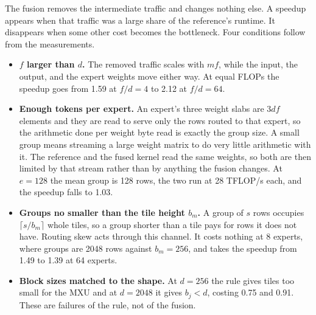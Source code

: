 \documentclass[10pt]{article}
\begin{document}
The fusion removes the intermediate traffic and changes nothing else. A
speedup appears when that traffic was a large share of the reference's
runtime. It disappears when some other cost becomes the bottleneck. Four
conditions follow from the measurements.

\begin{itemize}
\itemsep2pt
  \item \textbf{$f$ larger than $d$.} The removed traffic scales with $mf$,
    while the input, the output, and the expert weights move either way. At
    equal FLOPs the speedup goes from 1.59 at $f/d = 4$ to 2.12 at
    $f/d = 64$.
  \item \textbf{Enough tokens per expert.} An expert's three weight slabs
    are $3df$ elements and they are read to serve only the rows routed to
    that expert, so the arithmetic done per weight byte read is exactly the
    group size. A small group means streaming a large weight matrix to do
    very little arithmetic with it. The reference and the fused kernel read
    the same weights, so both are then limited by that stream rather than by
    anything the fusion changes. At $e = 128$ the mean group is 128 rows,
    the two run at 28 TFLOP/s each, and the speedup falls to 1.03.
  \item \textbf{Groups no smaller than the tile height $b_m$.} A group of
    $s$ rows occupies $\lceil s / b_m \rceil$ whole tiles, so a group
    shorter than a tile pays for rows it does not have. Routing skew acts
    through this channel. It costs nothing at 8 experts, where groups are
    2048 rows against $b_m = 256$, and takes the speedup from 1.49 to 1.39
    at 64 experts.
  \item \textbf{Block sizes matched to the shape.} At $d = 256$ the rule
    gives tiles too small for the MXU and at $d = 2048$ it gives $b_j < d$,
    costing 0.75 and 0.91. These are failures of the rule, not of the
    fusion.
\end{itemize}
\end{document}
